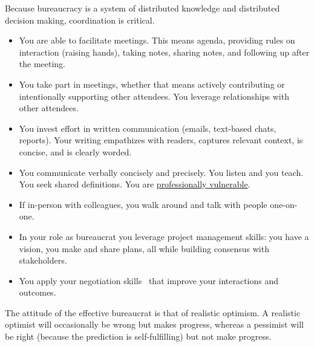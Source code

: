 Because bureaucracy is a system of distributed knowledge and distributed decision making, coordination is critical. 
\begin{itemize}
    \item You are able to facilitate meetings. This means agenda, providing rules on interaction (raising hands), taking notes, sharing notes, and following up after the meeting.
    \item You take part in meetings, whether that means actively contributing or intentionally supporting other attendees. You leverage relationships with other attendees. 
    \item You invest effort in written communication (emails, text-based chats, reports). Your writing empathizes with readers, captures relevant context, is concise, and is clearly worded.
    \item You communicate verbally concisely and precisely. You listen and you teach. You seek shared definitions. You are \hyperref[sec:professional-vulnerablity]{professionally vulnerable}. 
    \item If in-person with colleagues, you walk around and talk with people one-on-one.  
    \item In your role as bureaucrat you leverage project management skills: you have a vision, you make and share plans, all while building consensus with stakeholders.
    \item You apply your negotiation skills~\cite{1982_Cohen} that improve your interactions and outcomes.
\end{itemize}

The attitude of the effective bureaucrat  is that of realistic optimism. A realistic optimist will occasionally be wrong but makes progress, whereas a pessimist will be right (because the prediction is self-fulfilling) but not make progress.
